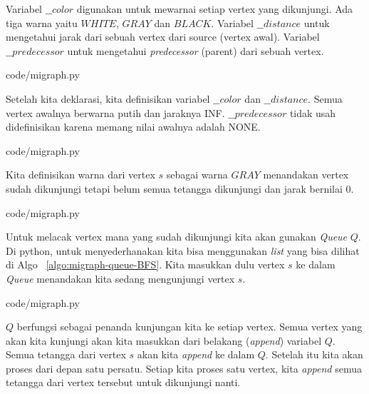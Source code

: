 Variabel $\_\_color$ digunakan untuk mewarnai setiap vertex yang dikunjungi. Ada tiga warna yaitu $WHITE$, $GRAY$ dan $BLACK$. Variabel $\_\_distance$ untuk mengetahui jarak dari sebuah vertex dari source (vertex awal). Variabel $\_\_predecessor$ untuk mengetahui \textit{predecessor} (parent) dari sebuah vertex. 


                {code/migraph.py}

Setelah kita deklarasi, kita definisikan variabel $\_\_color$ dan $\_\_distance$. Semua vertex awalnya berwarna putih dan jaraknya INF. $\_\_predecessor$ tidak usah didefinisikan karena memang nilai awalnya adalah NONE.


                {code/migraph.py}

Kita definisikan warna dari vertex $s$ sebagai warna $GRAY$ menandakan vertex sudah dikunjungi tetapi belum semua tetangga dikunjungi dan jarak bernilai 0.


                {code/migraph.py}

Untuk melacak vertex mana yang sudah dikunjungi kita akan gunakan \textit{Queue} $Q$. Di python, untuk menyederhanakan kita bisa menggunakan \textit{list} yang bisa dilihat di Algo ~\ref{algo:migraph-queue-BFS}. Kita masukkan dulu vertex $s$ ke dalam \textit{Queue} menandakan kita sedang mengunjungi vertex $s$.


                {code/migraph.py}

$Q$ berfungsi sebagai penanda kunjungan kita ke setiap vertex. Semua vertex yang akan kita kunjungi akan kita masukkan dari belakang (\textit{append}) variabel $Q$. Semua tetangga dari vertex $s$ akan kita \textit{append} ke dalam $Q$. Setelah itu kita akan proses dari depan satu persatu. Setiap kita proses satu vertex, kita \textit{append} semua tetangga dari vertex tersebut untuk dikunjungi nanti.

